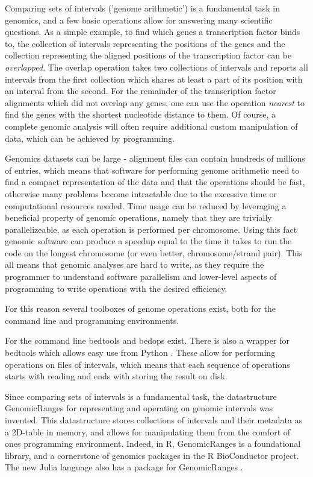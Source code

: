 \documentclass[10pt,letterpaper]{article}
\begin{document}
Comparing sets of intervals ('genome arithmetic') is a fundamental task in
genomics, and a few basic operations allow for answering many scientific
questions. As a simple example, to find which genes a transcription factor binds
to, the collection of intervals representing the positions of the genes and the
collection representing the aligned positions of the transcription factor can be
\textit{overlapped}. The overlap operation takes two collections of intervals
and reports all intervals from the first collection which shares at least a part
of its position with an interval from the second. For the remainder of the
transcription factor alignments which did not overlap any genes, one can use the
operation \textit{nearest} to find the genes with the shortest nucleotide
distance to them. Of course, a complete genomic analysis will often require
additional custom manipulation of data, which can be achieved by programming.

Genomics datasets can be large - alignment files can contain hundreds of
millions of entries, which means that software for performing genome arithmetic
need to find a compact representation of the data and that the operations should
be fast, otherwise many problems become intractable due to the excessive time or
computational resources needed. Time usage can be reduced by leveraging a
beneficial property of genomic operations, namely that they are trivially
parallelizeable, as each operation is performed per chromosome. Using this fact
genomic software can produce a speedup equal to the time it takes to run the
code on the longest chromosome (or even better, chromosome/strand pair). This
all means that genomic analyses are hard to write, as they require the
programmer to understand software parallelism and lower-level aspects of
programming to write operations with the desired efficiency.

For this reason several toolboxes of genome operations exist, both for the
command line and programming environments.

For the command line bedtools \cite{doi:10.1093/bioinformatics/btq033} and
bedops \cite{doi:10.1093/bioinformatics/bts277} exist. There is also a wrapper
for bedtools which allows easy use from Python
\cite{doi:10.1093/bioinformatics/btr539}. These allow for performing operations
on files of intervals, which means that each sequence of operations starts with
reading and ends with storing the result on disk.

Since comparing sets of intervals is a fundamental task, the datastructure
GenomicRanges\cite{10.1371/journal.pcbi.1003118} for representing and operating
on genomic intervals was invented. This datastructure stores collections of
intervals and their metadata as a 2D-table in memory, and allows for
manipulating them from the comfort of ones programming environment. Indeed, in
R, GenomicRanges is a foundational library, and a cornerstone of genomics
packages in the R BioConductor \cite{Gentleman2004} project. The new Julia
language \cite{doi:10.1137/141000671} also has a package for GenomicRanges
\cite{Haverty2017}.
\end{document}
